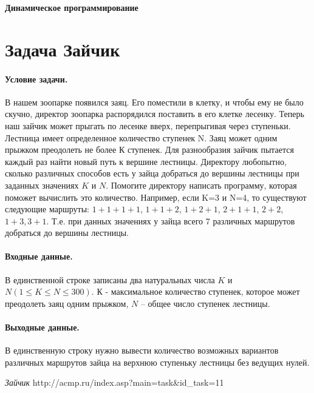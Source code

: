\documentclass[12pt, twoside]{article}
\begin{document}
 

\begin{center}
{\LARGE\bf
Динамическое программирование 
}
\end{center}

\section{Задача Зайчик\cite{Rabbit}}

\paragraph{Условие задачи.} В нашем зоопарке появился заяц. Его поместили в клетку, и чтобы ему не было скучно, директор зоопарка распорядился поставить в его клетке лесенку. Теперь наш зайчик может прыгать по лесенке вверх, перепрыгивая через ступеньки. Лестница имеет определенное количество ступенек N. Заяц может одним прыжком преодолеть не более $К$ ступенек. Для разнообразия зайчик пытается каждый раз найти новый путь к вершине лестницы. Директору любопытно, сколько различных способов есть у зайца добраться до вершины лестницы при заданных значениях $K$ и $N$. Помогите директору написать программу, которая поможет вычислить это количество. Например, если K=3 и N=4, то существуют следующие маршруты: $1+1+1+1$, $1+1+2$, $1+2+1$, $2+1+1$, $2+2$, $1+3, 3+1$. Т.е. при данных значениях у зайца всего 7 различных маршрутов добраться до вершины лестницы.
\paragraph{Входные данные.} В единственной строке записаны два натуральных числа $K$ и $N (1 \leq K \leq N \leq 300)$. $К$ - максимальное количество ступенек, которое может преодолеть заяц одним прыжком, $N$ – общее число ступенек лестницы.
\paragraph{Выходные данные.} В единственную строку нужно вывести количество возможных вариантов различных маршрутов зайца на верхнюю ступеньку лестницы без ведущих нулей.

\begin{thebibliography}{99}
	\textit{Зайчик} {http://acmp.ru/index.asp?main=task\&id\_task=11}
\end{thebibliography}
\end{document}

